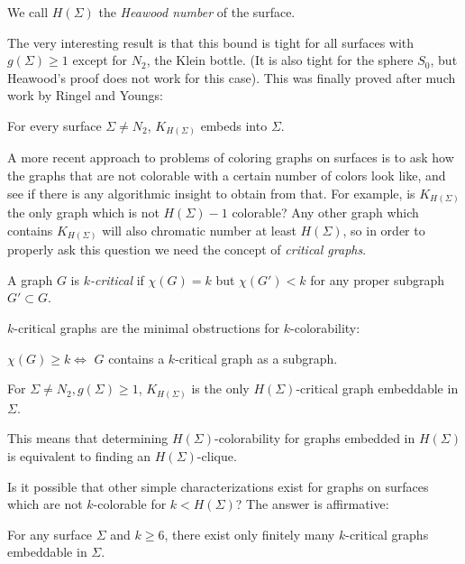 We call $H(\Sigma)$ the \emph{Heawood number} of the surface.

The very interesting result is that this bound is tight for all surfaces with $g(\Sigma) \geq 1$
except for $N_2$, the Klein bottle. (It is also tight for the sphere $S_0$, but Heawood's proof
does not work for this case). This was finally proved after much work by Ringel and Youngs:

\begin{theorem}
For every surface $\Sigma \neq N_2$, $K_{H(\Sigma)}$ embeds into $\Sigma$.
\end{theorem}

A more recent approach to problems of coloring graphs on surfaces is to ask how the graphs
that are not colorable with a certain number of colors look like, and see if there is any 
algorithmic insight to obtain from that.
For example, is $K_{H(\Sigma)}$ the only graph which is not $H(\Sigma)-1$ colorable?
Any other graph which contains $K_{H(\Sigma)}$ will also chromatic number at least $H(\Sigma)$,
so in order to properly ask this question we need the concept of \emph{critical graphs}.

\begin{definition}
A graph $G$ is \emph{$k$-critical} if $\chi(G) = k$ but $\chi(G') < k$ for any proper subgraph
$G' \subset G$. 
\end{definition}

$k$-critical graphs are the minimal obstructions for $k$-colorability:

\begin{observation}
$\chi(G) \geq k \iff$ $G$ contains a $k$-critical graph as a subgraph.
\end{observation}

\begin{theorem}
For $\Sigma \neq N_2, g(\Sigma) \geq 1$, $K_{H(\Sigma)}$ is the only $H(\Sigma)$-critical graph
embeddable in $\Sigma$.
\end{theorem}

This means that determining $H(\Sigma)$-colorability for graphs embedded in $H(\Sigma)$ is 
equivalent to finding an $H(\Sigma)$-clique. 

Is it possible that other simple characterizations exist for graphs on surfaces which are 
not $k$-colorable for $k < H(\Sigma)$? The answer is affirmative:

\begin{theorem}
For any surface $\Sigma$ and $k \geq 6$, there exist only finitely many $k$-critical graphs 
embeddable in $\Sigma$.
\end{theorem}

